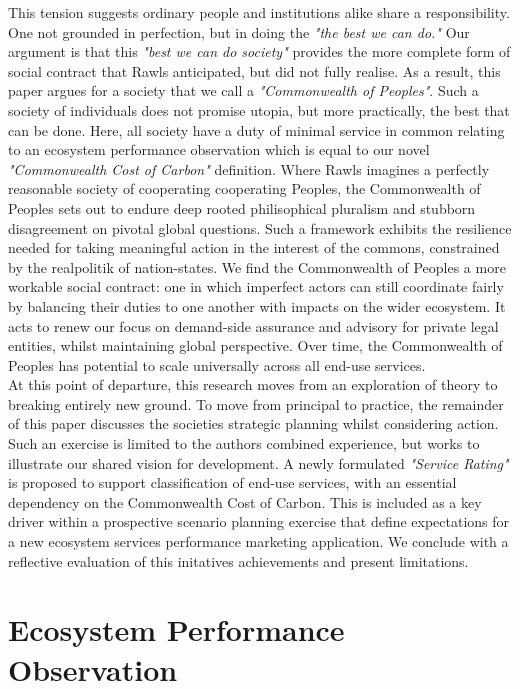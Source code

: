 \documentclass[11pt, oneside]{article}   	%
\begin{document}
This tension suggests ordinary people and institutions alike share a responsibility.
One not grounded in perfection, but in doing the \emph{"the best we can do."}
Our argument is that this \emph{"best we can do society"} provides the more complete form of social contract that Rawls anticipated, but did not fully realise.
As a result, this paper argues for a society that we call a \emph{"Commonwealth of Peoples"}.
Such a society of individuals does not promise utopia, but more practically, the best that can be done.
Here, all society have a duty of minimal service in common relating to an ecosystem performance observation which is equal to our novel \emph{"Commonwealth Cost of Carbon"} definition.
Where Rawls imagines a perfectly reasonable society of cooperating cooperating Peoples, the Commonwealth of Peoples sets out to endure deep rooted philisophical pluralism and stubborn disagreement on pivotal global questions.
Such a framework exhibits the resilience needed for taking meaningful action in the interest of the commons, constrained by the realpolitik of nation-states.
We find the Commonwealth of Peoples a more workable social contract: one in which imperfect actors can still coordinate fairly by balancing their duties to one another with impacts on the wider ecosystem.
It acts to renew our focus on demand-side assurance and advisory for private legal entities, whilst maintaining global perspective.
Over time, the Commonwealth of Peoples has potential to scale universally across all end-use services.\\

At this point of departure, this research moves from an exploration of theory to breaking entirely new ground.
To move from principal to practice, the remainder of this paper discusses the societies strategic planning whilst considering action.
Such an exercise is limited to the authors combined experience, but works to illustrate our shared vision for development.
A newly formulated \emph{"Service Rating"} is proposed to support classification of end-use services, with an essential dependency on the Commonwealth Cost of Carbon.
This is included as a key driver within a prospective scenario planning exercise that define expectations for a new ecosystem services performance marketing application.
We conclude with a reflective evaluation of this initatives achievements and present limitations.\\


\section{Ecosystem Performance Observation}
\end{document}
